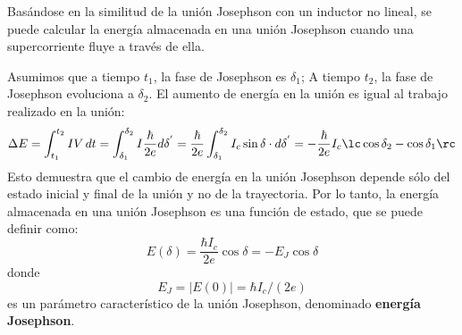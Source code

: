 
        Basándose en la similitud de la unión Josephson con un inductor no lineal, se puede calcular la energía almacenada en una unión Josephson cuando una supercorriente fluye a través de ella.

        Asumimos que a tiempo $t_1$, la fase de Josephson es $\delta_1$; A tiempo $t_2$, la fase de Josephson evoluciona a $\delta_2$. El aumento de energía en la unión es igual al trabajo realizado en la unión:
        \begin{equation}
            \Delta E 
            = \int_{t_1}^{t_2} IV \, dt 
            = \int_{\delta_1}^{\delta_2} I \frac{\hbar}{2e} d \delta^{'} 
            = \frac{\hbar}{2e} \int_{\delta_1}^{\delta_2} I_c \sin \delta \cdot d \delta^{'} 
            = - \frac{\hbar}{2e} I_c \lc \cos \delta_2 - \cos \delta_1 \rc
        \end{equation}
        Esto demuestra que el cambio de energía en la unión Josephson depende sólo del estado inicial y final de la unión y no de la trayectoria. Por lo tanto, la energía almacenada en una unión Josephson es una función de estado, que se puede definir como:
        \begin{equation} \label{ec_sqc_jj_E}
            \boxed{E (\delta) = \frac{\hbar I_c}{2e} \cos \delta = - E_J \cos \delta }
        \end{equation}
        donde 
        \begin{equation}  \label{ec_sqc_jj_EJ}
            E_J = \left| E(0) \right| = \hbar I_c/(2e)   
        \end{equation}
        es un parámetro característico de la unión Josephson, denominado \textbf{energía Josephson}.




 

